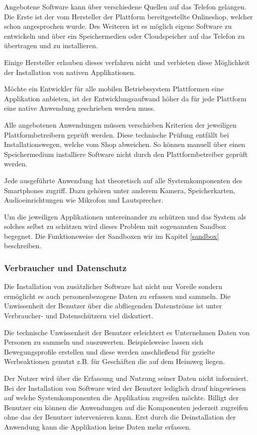 Angebotene Software kann über verschiedene Quellen auf das Telefon gelangen. Die Erste ist der vom Hersteller der Plattform bereitgestellte Onlineshop, welcher schon angesprochen wurde. Des Weiteren ist es möglich eigene Software zu entwickeln und über ein Speichermedien oder Cloudspeicher auf das Telefon zu übertragen und zu installieren.

Einige Hersteller erlauben dieses verfahren nicht und verbieten diese Möglichkeit der Installation von nativen Applikationen.

Möchte ein Entwickler für alle mobilen Betriebssystem Plattformen eine Applikation anbieten, ist der Entwicklungsaufwand höher da für jede Plattform eine native Anwendung geschrieben werden muss.

Alle angebotenen Anwendungen müssen verschieben Kriterien der jeweiligen Plattformbetreibern geprüft werden. Diese technische Prüfung entfällt bei Installationswegen, welche vom Shop abweichen. So können manuell über einen Speichermedium installiere Software nicht durch den Plattformbetreiber geprüft werden.

Jede ausgeführte Anwendung hat theoretisch auf alle Systemkomponenten des Smartphones zugriff. Dazu gehören unter anderem Kamera, Speicherkarten, Audioeinrichtungen wie Mikrofon und Lautsprecher.

Um die jeweiligen Applikationen untereinander zu schützen und das System als solches selbst zu schützen wird dieses Problem mit sogenannten Sandbox begegnet. Die Funktionsweise der Sandboxen wir im Kapitel \ref{sandbox} beschreiben.
\subsubsection{Verbraucher und Datenschutz}
Die Installation von zusätzlicher Software hat nicht nur Voreile sondern ermöglicht es auch personenbezogene Daten zu erfassen und sammeln. Die Unwissenheit der Benutzer über die abfliegenden Datenströme ist unter Verbraucher- und Datenschützern viel diskutiert.

Die technische Unwissenheit der Benutzer erleichtert es Unternehmen Daten von Personen zu sammeln und auszuwerten. Beispielsweise lassen sich Bewegungsprofile erstellen und diese werden anschließend für gezielte Werbeaktionen genutzt z.B. für Geschäften die auf dem Heimweg liegen.

Der Nutzer wird über die Erfassung und Nutzung seiner Daten nicht informiert. Bei der Installation von Software wird der Benutzer lediglich drauf hingewiesen auf welche Systemkomponenten die Applikation zugreifen möchte. Billigt der Benutzer ein können die Anwendungen auf die Komponenten jederzeit zugreifen ohne das der Benutzer intervenieren kann. Erst durch die Deinstallation der Anwendung kann die Applikation keine Daten mehr erfassen.

